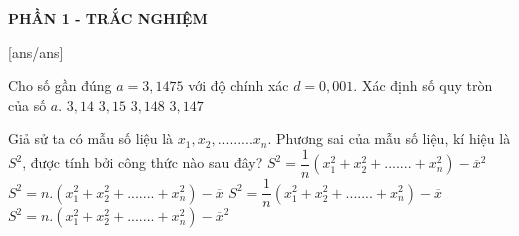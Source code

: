 
\begin{center}
	\textbf{PHẦN 1 - TRẮC NGHIỆM}
\end{center}
[ans/ans]
\begin{ex}%
	Cho số gần đúng $a=3,1475$ với độ chính xác $d=0,001$. Xác định số quy tròn của số $a$.
	\choice
	{$3,14$}
	{\True $3,15$}
	{$3,148$}
	{$3,147$}
\end{ex}
\begin{ex}%
	Giả sử ta có mẫu số liệu là $x_1,x_2,.........x_n$. Phương sai của mẫu số liệu, kí hiệu là $S^2$, được tính bởi công thức nào sau đây?
	\choice
	{\True $S^2=\dfrac{1}{n}(x_1^2+x_2^2+.......+x_n^2) - \overline{x}^2$}
	{$S^2=n.(x_1^2+x_2^2+.......+x_n^2) - \overline{x}$}
	{$S^2=\dfrac{1}{n}(x_1^2+x_2^2+.......+x_n^2) - \overline{x}$}
	{$S^2=n.(x_1^2+x_2^2+.......+x_n^2) - \overline{x}^2$}

\end{ex}

